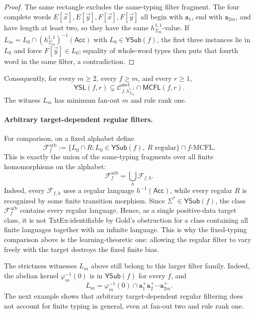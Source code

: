 \documentclass[11pt]{article}
\numberwithin{equation}{section}
\theoremstyle{plain}
\theoremstyle{definition}
\theoremstyle{remark}
\newcommand{\Cmcf}[2]{\mathcal{C}^{\mathrm{mcf}}_{#1,#2}}
\newcommand{\Ffrag}[2]{\mathcal{F}_{#1,#2}}
\newcommand{\tuple}[1]{\vec{#1}}
\newcommand{\YSub}[1]{\mathsf{YSub}(#1)}
\newcommand{\YSL}[2]{\mathsf{YSL}(#1,#2)}
\begin{document}
\begin{proof}
The same rectangle excludes the same-typing filter fragment.  The four complete
words $E[\tuple x],E[\tuple y],F[\tuple x],F[\tuple y]$ all begin with
$\mathtt a_1$, end with $\mathtt a_{2m}$, and have length at least two, so they
have the same $h_{\Sigma_m}^{1,1}$-value.  If
$L_m=L_0\cap(h_{\Sigma_m}^{1,1})^{-1}(\mathsf{Acc})$ with
$L_0\in\YSub{f}$, the first three instances lie in $L_0$ and force
$F[\tuple y]\in L_0$; equality of whole-word types then puts that fourth word
in the same filter, a contradiction.
\end{proof}

Consequently, for every $m\ge2$, every $f\ge m$, and every $r\ge1$,
\[
  \YSL{f}{r}\subsetneq
  \Cmcf{f}{h_{\Sigma_m}^{1,1}}\cap\mathsf{MCFL}(f,r).
\]
The witness $L_m$ has minimum fan-out $m$ and rule rank one.

\paragraph{Arbitrary target-dependent regular filters.}
For comparison, on a fixed alphabet define
\[
 \mathcal F_f^{\mathrm{arb}}
 :=\bigl\{L_0\cap R:L_0\in\YSub{f},\ R\text{ regular}\bigr\}
   \cap f\text{-}\mathrm{MCFL}.
\]
This is exactly the union of the same-typing fragments over all finite
homomorphisms on the alphabet:
\[
  \mathcal F_f^{\mathrm{arb}}=\bigcup_h\Ffrag{f}{h}.
\]
Indeed, every $\Ffrag{f}{h}$ uses a regular language $h^{-1}(\mathsf{Acc})$,
while every regular $R$ is recognized by some finite transition morphism.
Since $\Sigma^*\in\YSub{f}$, the class $\mathcal F_f^{\mathrm{arb}}$ contains
every regular language.  Hence, as a single positive-data target class, it is
not TxtEx-identifiable by Gold's obstruction for a class containing all finite
languages together with an infinite language.  This is why the
fixed-typing comparison above is the learning-theoretic one: allowing the
regular filter to vary freely with the target destroys the fixed finite bias.

The strictness witnesses $L_m$ above still belong to this larger filter
family.  Indeed, the abelian kernel
$\varphi_m^{-1}(0)$ is in $\YSub{f}$ for every $f$, and
\[
  L_m=\varphi_m^{-1}(0)\cap
       \mathtt a_1^+\mathtt a_2^+\cdots\mathtt a_{2m}^+.
\]
The next example shows that arbitrary target-dependent regular filtering does
not account for finite typing in general, even at fan-out two and rule rank
one.
\end{document}
